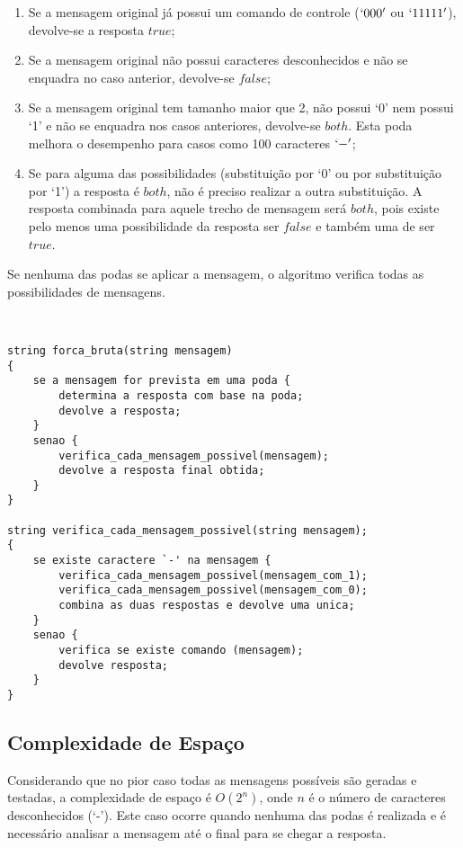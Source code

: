 \documentclass[a4paper,12pt,titlepage]{article}
\begin{document}
\begin{enumerate}[leftmargin=1.5cm]
    \item Se a mensagem original já possui um comando de controle ($`000'$ ou $`11111'$), devolve-se a resposta $true$;  
    \item Se a mensagem original não possui caracteres desconhecidos e não se enquadra no caso anterior, devolve-se $false$;
    \item Se a mensagem original tem tamanho maior que 2, não possui `0' nem possui `1' e não se enquadra nos casos anteriores, devolve-se $both$. Esta poda melhora o desempenho para casos como 100 caracteres $`-'$;
    \item Se para alguma das possibilidades (substituição por `0' ou por substituição por `1') a resposta é $both$, não é preciso realizar a outra substituição. A resposta combinada para aquele trecho de mensagem será $both$, pois existe pelo menos uma possibilidade da resposta ser $false$ e também uma de ser $true$.
    \ \\
\end{enumerate}

Se nenhuma das podas se aplicar a mensagem, o algoritmo verifica todas as possibilidades de mensagens.

\ \\ 
\begin{lstlisting}[caption=Algoritmo de Força Bruta]
string forca_bruta(string mensagem)
{
    se a mensagem for prevista em uma poda {
        determina a resposta com base na poda;
        devolve a resposta;
    } 
    senao {
        verifica_cada_mensagem_possivel(mensagem);
        devolve a resposta final obtida;
    }
}

string verifica_cada_mensagem_possivel(string mensagem);
{
    se existe caractere `-' na mensagem {
        verifica_cada_mensagem_possivel(mensagem_com_1);
        verifica_cada_mensagem_possivel(mensagem_com_0);
        combina as duas respostas e devolve uma unica;
    }
    senao {
        verifica se existe comando (mensagem);
        devolve resposta;
    }
}
\end{lstlisting}

\subsection{Complexidade de Espaço}

Considerando que no pior caso todas as mensagens possíveis são geradas e testadas, a complexidade de espaço é $O(2^n)$, onde $n$ é o número de caracteres desconhecidos (`-'). Este caso ocorre quando nenhuma das podas é realizada e é necessário analisar a mensagem até o final para se chegar a resposta.
\end{document}
